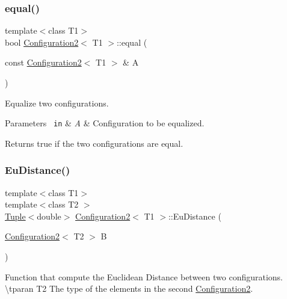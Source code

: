 \subsubsection{\texorpdfstring{equal()}{equal()}}
{\footnotesize\ttfamily template$<$class T1$>$ \\
bool \mbox{\hyperlink{class_configuration2}{Configuration2}}$<$ T1 $>$\+::equal (\begin{DoxyParamCaption}\item[{const \mbox{\hyperlink{class_configuration2}{Configuration2}}$<$ T1 $>$ \&}]{A }\end{DoxyParamCaption})\hspace{0.3cm}{\ttfamily [inline]}}



Equalize two configurations. 


\begin{DoxyParams}[1]{Parameters}
\mbox{\texttt{ in}}  & {\em A} & Configuration to be equalized. \\
\hline
\end{DoxyParams}
\begin{DoxyReturn}{Returns}
true if the two configurations are equal. 
\end{DoxyReturn}
\mbox{\label{class_configuration2_aae3e1b7e718b227b6fa65db67ab2b8eb}} 
\subsubsection{\texorpdfstring{EuDistance()}{EuDistance()}}
{\footnotesize\ttfamily template$<$class T1$>$ \\
template$<$class T2 $>$ \\
\mbox{\hyperlink{class_tuple}{Tuple}}$<$double$>$ \mbox{\hyperlink{class_configuration2}{Configuration2}}$<$ T1 $>$\+::Eu\+Distance (\begin{DoxyParamCaption}\item[{\mbox{\hyperlink{class_configuration2}{Configuration2}}$<$ T2 $>$}]{B }\end{DoxyParamCaption})\hspace{0.3cm}{\ttfamily [inline]}}



Function that compute the Euclidean Distance between two configurations. \textbackslash{}tparan T2 The type of the elements in the second {\ttfamily \mbox{\hyperlink{class_configuration2}{Configuration2}}}. 


